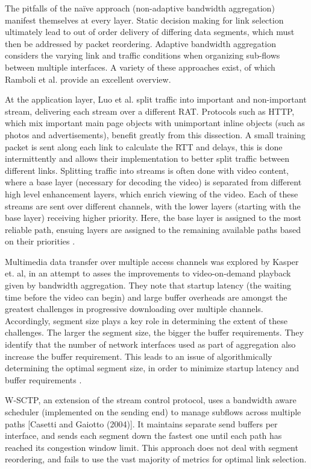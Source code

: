 \documentclass[12pt]{article}
\begin{document}
	The pitfalls of the na\"{i}ve approach (non-adaptive bandwidth aggregation) manifest themselves at every layer. Static decision making for link selection ultimately lead to out of order delivery of differing data segments, which must then be addressed by packet reordering. Adaptive bandwidth aggregation considers the varying link and traffic conditions when organizing sub-flows between multiple interfaces. A variety of these approaches exist, of which Ramboli et al. provide an excellent overview. 

	At the application layer, Luo et al. \cite{1204756} split traffic into important and non-important stream, delivering each stream over a different RAT. Protocols such as HTTP, which mix important main page objects with unimportant inline objects (such as photos and advertisements), benefit greatly from this dissection. A small training packet is sent along each link to calculate the RTT and delays, this is done intermittently and allows their implementation to better split traffic between different links. Splitting traffic into streams is often done with video content, where a base layer (necessary for decoding the video) is separated from different high level enhancement layers, which enrich viewing of the video. Each of these streams are sent over different channels, with the lower layers (starting with the base layer) receiving higher priority. Here, the base layer is assigned to the most reliable path, ensuing layers are assigned to the remaining available paths based on their priorities \cite{1363842}.

	Multimedia data transfer over multiple access channels was explored by Kasper et. al, in an attempt to asses the improvements to video-on-demand playback given by bandwidth aggregation. They note that startup latency (the waiting time before the video can begin) and large buffer overheads are amongst the greatest challenges in progressive downloading over multiple channels. Accordingly, segment size plays a key role in determining the extent of these challenges. The larger the segment size, the bigger the buffer requirements. They identify that the number of network interfaces used as part of aggregation also increase the buffer requirement. This leads to an issue of algorithmically determining the optimal segment size, in order to minimize startup latency and buffer requirements \cite{5421846}.

	W-SCTP, an extension of the stream control protocol, uses a bandwidth aware scheduler (implemented on the sending end) to manage subflows across multiple paths [Casetti and Gaiotto (2004)]. It maintains separate send buffers per interface, and sends each segment down the fastest one until each path has reached its congestion window limit. This approach does not deal with segment reordering, and fails to use the vast majority of metrics for optimal link selection. 
\end{document}
